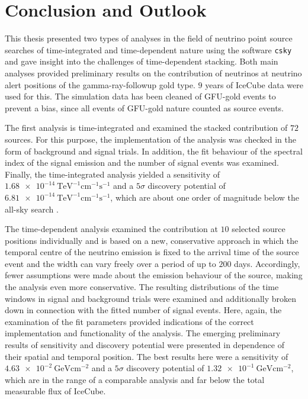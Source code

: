\chapter{Conclusion and Outlook} \label{sec:outlook}

This thesis presented two types of analyses in the field of neutrino point source searches of time-integrated and time-dependent nature using the software \texttt{csky} and gave insight into the challenges of time-dependent stacking.
Both main analyses provided preliminary results on the contribution of neutrinos at neutrino alert positions of the gamma-ray-followup gold type.
$\num{9}$ years of IceCube data were used for this.
The simulation data has been cleaned of GFU-gold events to prevent a bias, since all events of GFU-gold nature counted as source events.

The first analysis is time-integrated and examined the stacked contribution of $\num{72}$ sources.
For this purpose, the implementation of the analysis was checked in the form of background and signal trials.
In addition, the fit behaviour of the spectral index of the signal emission and the number of signal events was examined.
Finally, the time-integrated analysis yielded a sensitivity of $\SI{1.68e-14}{\tera\electronvolt\tothe{-1}\centi\meter\tothe{-1}\second\tothe{-1}}$ and a $\num{5}\sigma$ discovery potential of $\SI{6.81e-14}{\tera\electronvolt\tothe{-1}\centi\meter\tothe{-1}\second\tothe{-1}}$, which are about one order of magnitude below the all-sky search \cite{all_sky_paper}.

The time-dependent analysis examined the contribution at $\num{10}$ selected source positions individually and is based on a new, conservative approach in which the temporal centre of the neutrino emission is fixed to the arrival time of the source event and the width can vary freely over a period of up to $\num{200}$ days.
Accordingly, fewer assumptions were made about the emission behaviour of the source, making the analysis even more conservative.
The resulting distributions of the time windows in signal and background trials were examined and additionally broken down in connection with the fitted number of signal events.
Here, again, the examination of the fit parameters provided indications of the correct implementation and functionality of the analysis.
The emerging preliminary results of sensitivity and discovery potential were presented in dependence of their spatial and temporal position.
The best results here were a sensitivity of $\SI{4.63e-2}{\giga\electronvolt\centi\meter\tothe{-2}}$ and a $\num{5}\sigma$ discovery potential of $\SI{1.32e-1}{\giga\electronvolt\centi\meter\tothe{-2}}$, which are in the range of a comparable analysis \cite{martina} and far below the total measurable flux of IceCube.

